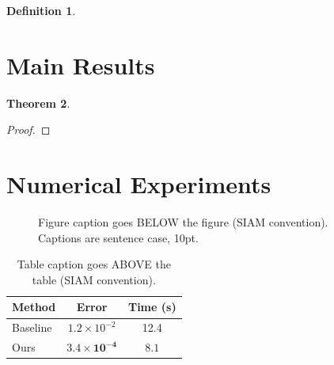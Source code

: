 \documentclass[11pt]{article}
\newtheorem{theorem}{Theorem}
\theoremstyle{definition}
\newtheorem{definition}[theorem]{Definition}
\theoremstyle{remark}
\begin{document}
\begin{definition}
\label{def:example}
\end{definition}

\section{Main Results}
\label{sec:results}

\begin{theorem}
\label{thm:main}
\end{theorem}

\begin{proof}
\end{proof}

\section{Numerical Experiments}
\label{sec:experiments}

\begin{figure}[t]
\centering
\fbox{\rule{0pt}{5cm}\rule{0.7\textwidth}{0pt}}
\caption{Figure caption goes BELOW the figure (SIAM convention).
Captions are sentence case, 10pt.}
\label{fig:result}
\end{figure}

\begin{table}[t]
\caption{Table caption goes ABOVE the table (SIAM convention).}
\label{tab:results}
\centering
\begin{tabular}{lcc}
\toprule
Method   & Error          & Time (s)       \\
\midrule
Baseline & $1.2 \times 10^{-2}$          & 12.4          \\
Ours     & $\mathbf{3.4 \times 10^{-4}}$ & $\mathbf{8.1}$ \\
\bottomrule
\end{tabular}
\end{table}
\end{document}
